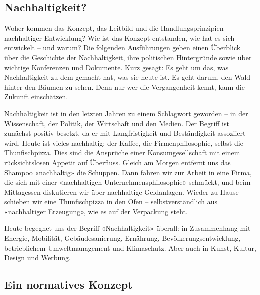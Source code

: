 \documentclass[
  letterpaper,
  DIV=11,
  numbers=noendperiod]{scrartcl}
\author{}
\date{}
\begin{document}
\subsection{Nachhaltigkeit?}\label{nachhaltigkeit}

Woher kommen das Konzept, das Leitbild und die Handlungsprinzipien
nachhaltiger Entwicklung? Wie ist das Konzept entstanden, wie hat es
sich entwickelt -- und warum? Die folgenden Ausführungen geben einen
Überblick über die Geschichte der Nachhaltigkeit, ihre politischen
Hintergründe sowie über wichtige Konferenzen und Dokumente. Kurz gesagt:
Es geht um das, was Nachhaltigkeit zu dem gemacht hat, was sie heute
ist. Es geht darum, den Wald hinter den Bäumen zu sehen. Denn nur wer
die Vergangenheit kennt, kann die Zukunft einschätzen.

Nachhaltigkeit ist in den letzten Jahren zu einem Schlagwort geworden --
in der Wissenschaft, der Politik, der Wirtschaft und den Medien. Der
Begriff ist zunächst positiv besetzt, da er mit Langfristigkeit und
Beständigkeit assoziiert wird. Heute ist vieles nachhaltig: der Kaffee,
die Firmenphilosophie, selbst die Thunfischpizza. Dies sind die
Ansprüche einer Konsumgesellschaft mit einem rücksichtslosen Appetit auf
Überfluss. Gleich am Morgen entfernt uns das Shampoo «nachhaltig» die
Schuppen. Dann fahren wir zur Arbeit in eine Firma, die sich mit einer
«nachhaltigen Unternehmensphilosophie» schmückt, und beim Mittagessen
diskutieren wir über nachhaltige Geldanlagen. Wieder zu Hause schieben
wir eine Thunfischpizza in den Ofen -- selbstverständlich aus
«nachhaltiger Erzeugung», wie es auf der Verpackung steht.

Heute begegnet uns der Begriff «Nachhaltigkeit» überall: in Zusammenhang
mit Energie, Mobilität, Gebäudesanierung, Ernährung,
Bevölkerungsentwicklung, betrieblichem Umweltmanagement und Klimaschutz.
Aber auch in Kunst, Kultur, Design und Werbung.

\subsection{Ein normatives Konzept}\label{ein-normatives-konzept}
\end{document}
